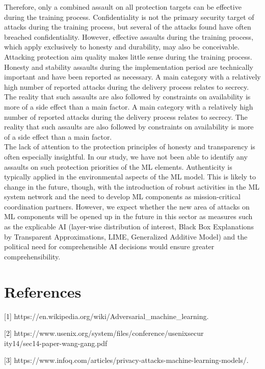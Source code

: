 \documentclass[journal,twoside,web]{ieeecolor}
\begin{document}
Therefore, only a combined assault on all protection targets can be effective during the training process. Confidentiality is not the primary security target of attacks during the training process, but several of the attacks found have often breached confidentiality. However, effective assaults during the training process, which apply exclusively to honesty and durability, may also be conceivable. Attacking protection aim quality makes little sense during the training process. Honesty and stability assaults during the implementation period are technically important and have been reported as necessary. A main category with a relatively high number of reported attacks during the delivery process relates to secrecy. The reality that such assaults are also followed by constraints on availability is more of a side effect than a main factor. A main category with a relatively high number of reported attacks during the delivery process relates to secrecy. The reality that such assaults are also followed by constraints on availability is more of a side effect than a main factor.\\
The lack of attention to the protection principles of honesty and transparency is often especially insightful. In our study, we have not been able to identify any assaults on such protection priorities of the ML elements. Authenticity is typically applied in the environmental aspects of the ML model. This is likely to change in the future, though, with the introduction of robust activities in the ML system network and the need to develop ML components as mission-critical coordination partners. However, we expect whether the new area of attacks on ML components will be opened up in the future in this sector as measures such as the explicable AI (layer-wise distribution of interest, Black Box Explanations by Transparent Approximations, LIME, Generalized Additive Model) and the political need for comprehensible AI decisions would ensure greater comprehensibility.

\section{References}

[1] https://en.wikipedia.org/wiki/Adversarial_machine_learning.

[2] https://www.usenix.org/system/files/conference/usenixsecur\\ity14/sec14-paper-wang-gang.pdf
 
[3] https://www.infoq.com/articles/privacy-attacks-machine-learning-models/.
 
\end{document}
